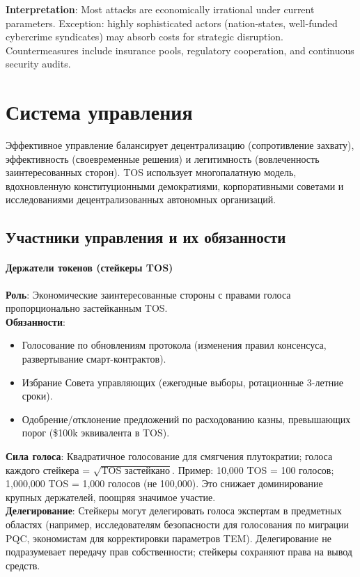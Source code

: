 \documentclass[11pt]{article}
\begin{document}
\textbf{Interpretation}: Most attacks are economically irrational under current parameters. Exception: highly sophisticated actors (nation-states, well-funded cybercrime syndicates) may absorb costs for strategic disruption. Countermeasures include insurance pools, regulatory cooperation, and continuous security audits.

\section{Система управления}
\label{sec:governance}

Эффективное управление балансирует децентрализацию (сопротивление захвату), эффективность (своевременные решения) и легитимность (вовлеченность заинтересованных сторон). TOS использует многопалатную модель, вдохновленную конституционными демократиями, корпоративными советами и исследованиями децентрализованных автономных организаций.

\subsection{Участники управления и их обязанности}

\paragraph{Держатели токенов (стейкеры TOS)}
\textbf{Роль}: Экономические заинтересованные стороны с правами голоса пропорционально застейканным TOS.\\
\textbf{Обязанности}:
\begin{itemize}[noitemsep]
  \item Голосование по обновлениям протокола (изменения правил консенсуса, развертывание смарт-контрактов).
  \item Избрание Совета управляющих (ежегодные выборы, ротационные 3-летние сроки).
  \item Одобрение/отклонение предложений по расходованию казны, превышающих порог (\$100k эквивалента в TOS).
\end{itemize}
\textbf{Сила голоса}: Квадратичное голосование для смягчения плутократии; голоса каждого стейкера = $\sqrt{\text{TOS застейкано}}$. Пример: 10,000 TOS = 100 голосов; 1,000,000 TOS = 1,000 голосов (не 100,000). Это снижает доминирование крупных держателей, поощряя значимое участие.\\
\textbf{Делегирование}: Стейкеры могут делегировать голоса экспертам в предметных областях (например, исследователям безопасности для голосования по миграции PQC, экономистам для корректировки параметров TEM). Делегирование не подразумевает передачу прав собственности; стейкеры сохраняют права на вывод средств.
\end{document}
